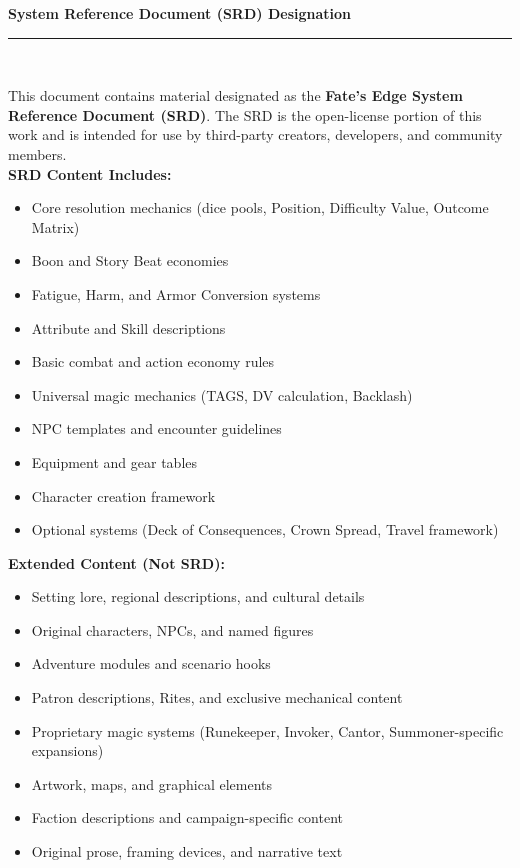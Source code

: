\begin{center}
  \vspace*{1.5in}
  {\Large\textbf{System Reference Document (SRD) Designation}}\\[0.3in]

  \rule{0.7\textwidth}{0.4pt}\\[0.3in]

  \begin{minipage}{0.85\textwidth}
    \small
    This document contains material designated as the \textbf{Fate's Edge System Reference Document (SRD)}.
    The SRD is the open-license portion of this work and is intended for use by third-party creators,
    developers, and community members.\\[0.2in]

    \textbf{SRD Content Includes:}
    \begin{itemize}
      \item Core resolution mechanics (dice pools, Position, Difficulty Value, Outcome Matrix)
      \item Boon and Story Beat economies
      \item Fatigue, Harm, and Armor Conversion systems
      \item Attribute and Skill descriptions
      \item Basic combat and action economy rules
      \item Universal magic mechanics (TAGS, DV calculation, Backlash)
      \item NPC templates and encounter guidelines
      \item Equipment and gear tables
      \item Character creation framework
      \item Optional systems (Deck of Consequences, Crown Spread, Travel framework)
    \end{itemize}

    \vspace{0.2in}

    \textbf{Extended Content (Not SRD):}
    \begin{itemize}
      \item Setting lore, regional descriptions, and cultural details
      \item Original characters, NPCs, and named figures
      \item Adventure modules and scenario hooks
      \item Patron descriptions, Rites, and exclusive mechanical content
      \item Proprietary magic systems (Runekeeper, Invoker, Cantor, Summoner-specific expansions)
      \item Artwork, maps, and graphical elements
      \item Faction descriptions and campaign-specific content
      \item Original prose, framing devices, and narrative text
    \end{itemize}


\end{minipage}
\end{center}

